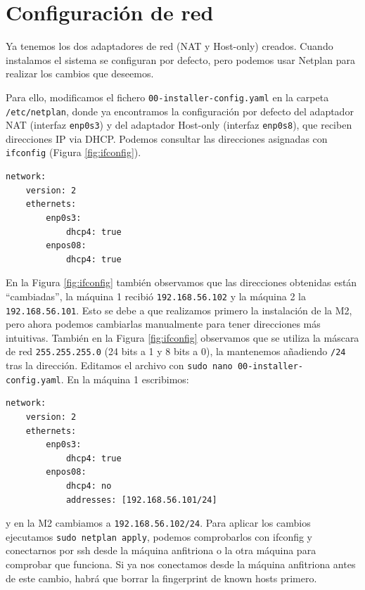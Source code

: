 \documentclass{article}
\begin{document}
\section{Configuración de red}

Ya tenemos los dos adaptadores de red (NAT y Host-only) creados. Cuando instalamos el sistema se configuran por defecto,
pero podemos usar Netplan para realizar los cambios que deseemos.

Para ello, modificamos el fichero \texttt{00-installer-config.yaml} en la carpeta \texttt{/etc/netplan}, donde ya encontramos
 la configuración por defecto del adaptador NAT (interfaz \texttt{enp0s3}) y del adaptador Host-only (interfaz \texttt{enp0s8}),
 que reciben direcciones IP via DHCP. Podemos consultar las direcciones asignadas con \texttt{ifconfig} (Figura \ref{fig:ifconfig}).

\begin{Verbatim}[tabsize=4]
network:
	version: 2
	ethernets:
		enp0s3:
			dhcp4: true
		enpos08:
			dhcp4: true
\end{Verbatim}

En la Figura \ref{fig:ifconfig} también observamos que las direcciones obtenidas están ``cambiadas'', la máquina 1 recibió
 \texttt{192.168.56.102} y la máquina 2 la \texttt{192.168.56.101}. Esto se debe a que realizamos primero la instalación de la M2,
 pero ahora podemos cambiarlas manualmente para tener direcciones más intuitivas. También en la Figura \ref{fig:ifconfig} observamos
 que se utiliza la máscara de red \texttt{255.255.255.0} (24 bits a 1 y 8 bits a 0), la mantenemos añadiendo \texttt{/24} tras la dirección.
  Editamos el archivo con 
 \texttt{sudo nano 00-installer-config.yaml}. En la máquina 1 escribimos:

\begin{Verbatim}[tabsize=4]
network:
	version: 2
	ethernets:
		enp0s3:
			dhcp4: true
		enpos08:
			dhcp4: no
			addresses: [192.168.56.101/24]
\end{Verbatim}

y en la M2 cambiamos a \texttt{192.168.56.102/24}. Para aplicar los cambios ejecutamos \texttt{sudo netplan apply}, podemos comprobarlos
con ifconfig y conectarnos por ssh desde la máquina anfitriona o la otra máquina para comprobar que funciona. Si ya nos conectamos
desde la máquina anfitriona antes de este cambio, habrá que borrar la fingerprint de known hosts primero.
\end{document}
